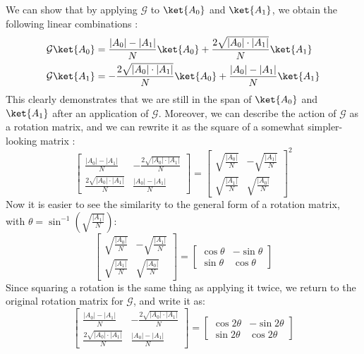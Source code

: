 We can show that by applying $\mathcal{G}$ to $\ket{A_0}$ and $\ket{A_1}$, we obtain the following linear combinations \cite{Qiskit2023}:
\begin{align*}
    \mathcal{G}\ket{A_0} &= \frac{|A_0|- |A_1|}{N}\ket{A_0} + \frac{2\sqrt{|A_0| \cdot |A_1|}}{N}\ket{A_1} \\
    \mathcal{G}\ket{A_1} &= -\frac{2\sqrt{|A_0| \cdot |A_1|}}{N}\ket{A_0} + \frac{|A_0|- |A_1|}{N}\ket{A_1}
\end{align*}
This clearly demonstrates that we are still in the span of $\ket{A_0}$ and $\ket{A_1}$ after an application of $\mathcal{G}$. Moreover, we can describe the action of $\mathcal{G}$ as a rotation matrix, and we can rewrite it as the square of a somewhat simpler-looking matrix \cite{Qiskit2023}:
\[
\begin{bmatrix}
    \frac{|A_0|- |A_1|}{N} & -\frac{2\sqrt{|A_0| \cdot |A_1|}}{N} \\
      \frac{2\sqrt{|A_0| \cdot |A_1|}}{N}   & \frac{|A_0|- |A_1|}{N}
\end{bmatrix} = 
\begin{bmatrix}
    \sqrt{\frac{|A_0|}{N}} & -\sqrt{\frac{|A_1|}{N}}\\
    \sqrt{\frac{|A_1|}{N}} & \sqrt{\frac{|A_0|}{N}}
\end{bmatrix}^2
\]
Now it is easier to see the similarity to the general form of a rotation matrix, with $\theta = \sin ^{-1} \left (\sqrt{\frac{|A_1|}{N}} \right )$: 
\[
\begin{bmatrix}
    \sqrt{\frac{|A_0|}{N}} & -\sqrt{\frac{|A_1|}{N}}\\
    \sqrt{\frac{|A_1|}{N}} & \sqrt{\frac{|A_0|}{N}}
\end{bmatrix} = \begin{bmatrix}
    \cos \theta & -\sin \theta \\
    \sin \theta & \cos \theta
\end{bmatrix}
\]
Since squaring a rotation is the same thing as applying it twice, we return to the original rotation matrix for $\mathcal{G}$, and write it as:
\[
\begin{bmatrix}
    \frac{|A_0|- |A_1|}{N} & -\frac{2\sqrt{|A_0| \cdot |A_1|}}{N} \\
      \frac{2\sqrt{|A_0| \cdot |A_1|}}{N}   & \frac{|A_0|- |A_1|}{N}
\end{bmatrix} = \begin{bmatrix}
    \cos 2\theta & -\sin 2\theta \\
    \sin 2\theta & \cos 2\theta
\end{bmatrix}
\]
